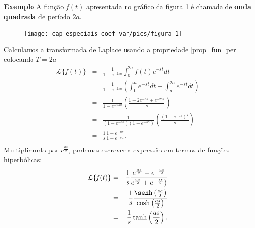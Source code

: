\documentclass[a4paper,10pt]{book}
\begin{document}
{\bf Exemplo} A função $f(t)$ apresentada no gráfico da figura \ref{fig_onda_quadrada} é chamada de {\bf onda quadrada} de período $2a$.
 \begin{figure}[!ht]
\begin{center}

\texttt{[image: cap\_especiais\_coef\_var/pics/figura\_1]}\end{center}
\caption{\label{fig_onda_quadrada}}
\end{figure}
Calculamos a transformada de Laplace usando a propriedade \ref{prop_fun_per} colocando $T=2a$
\begin{eqnarray*}
\mathcal{L}\{f(t)\}&=& \frac{1}{1-e^{-2sa}}\int_0^{2a}f(t)e^{-st}dt\\
&=& \frac{1}{1-e^{-2sa}}\left(\int_0^{a}e^{-st}dt-\int_a^{2a}e^{-st}dt\right)\\
&=& \frac{1}{1-e^{-2sa}}\left(\frac{1-2e^{-as}+e^{-2as}}{s}\right)\\
&=& \frac{1}{(1-e^{-sa})(1+e^{-sa})}\left(\frac{(1-e^{-as})^2}{s}\right)\\
&=&\frac{1}{s} \frac{1-e^{-as}}{1+e^{-sa}}.\\
\end{eqnarray*}
Multiplicando por $e^{\frac{as}{2}}$, podemos escrever a expressão em termos de funções hiperbólicas:
\begin{eqnarray*}
\mathcal{L}\{f(t)\}&=&\frac{1}{s} \frac{e^{\frac{as}{2}}-e^{-\frac{as}{2}}}{e^{\frac{as}{2}}+e^{-\frac{as}{2}})}\\
&=&\frac{1}{s} \frac{\senh\left(\frac{as}{2}\right)}{\cosh\left(\frac{as}{2}\right)}\\
&=&\frac{1}{s} \tanh\left(\frac{as}{2}\right).
\end{eqnarray*}
\end{document}
